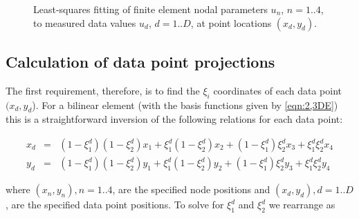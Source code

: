 \begin{figure}[htpb] \centering
  
  \caption{Least-squares fitting of finite element nodal parameters $u_{n}$,
    $n=1..4$, to measured data values $u_{d}$, $d=1..D$, at point locations
    $(x_{d}, y_{d})$.}
  \label{fig:linfieldfit}
\end{figure}

\subsection{Calculation of data point projections}

The first requirement, therefore, is to find the $\xi_{i}$ coordinates of each
data point $(x_{d}, y_{d}$). For a bilinear element (with the basis functions
given by \eqref{eqn:2,3DE}) this is a straightforward inversion of the
following relations for each data point:

\begin{equation}
  \begin{array}{rcl}
    x_{d}&=&(1-\xi_{1}^{d})(1-\xi_{2}^{d})x_{1}+\xi_{1}^{d}(1-\xi_{2}^{d})x_{2}
    +(1-\xi_{1}^{d})\xi_{2}^{d}x_{3}+\xi_{1}^{d}\xi_{2}^{d}x_{4} \\
    y_{d}&=&(1-\xi_{1}^{d})(1-\xi_{2}^{d})y_{1}+\xi_{1}^{d}(1-\xi_{2}^{d})y_{2}
    +(1-\xi_{1}^{d})\xi_{2}^{d}y_{3}+\xi_{1}^{d}\xi_{2}^{d}y_{4}
  \end{array}
  \label{eqn:datapointposfield}
\end{equation}

where $(x_{n}, y_{n}), n=1..4$, are the specified node positions and $(x_{d},
y_{d}), d=1..D$, are the specified data point positions. To solve
 for $\xi_{1}^{d}$ and $\xi_{2}^{d}$ we rearrange
 as

